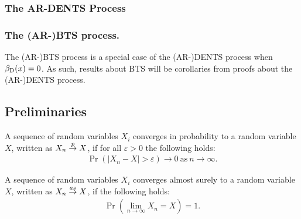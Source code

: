 \subsubsection{The AR-DENTS Process}
        









\subsubsection{The (AR-)BTS process.}

    The (AR-)BTS process is a special case of the (AR-)DENTS process when ${\beta_{{\textnormal{D}}}}(x)=0$. As such, results about BTS will be corollaries from proofs about the (AR-)DENTS process.













\subsection{Preliminaries}

    \begin{defn}
        A sequence of random variables $X_i$ \textnormal{converges in probability} to a random variable $X$, written as $X_n \overset{p}{\to} X$, if for all $\varepsilon>0$ the following holds:
        \begin{align}
            \Pr\left(\left|X_n - X\right| > \varepsilon\right) \rightarrow 0 \ \text{as} \ n \rightarrow \infty.
        \end{align}
    \end{defn}

    \begin{defn}
        A sequence of random variables $X_i$ \textnormal{converges almost surely} to a random variable $X$, written as $X_n \overset{as}{\to} X$, if the following holds:
        \begin{align}
            \Pr\left(\lim_{n\rightarrow\infty} X_n = X\right) = 1.
        \end{align}
    \end{defn}




